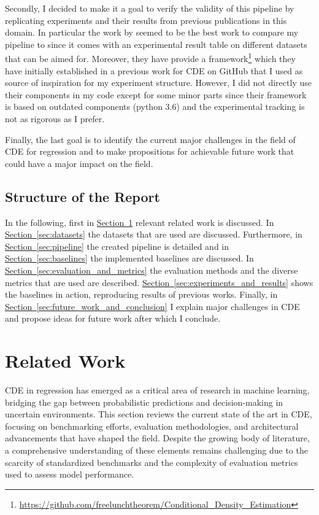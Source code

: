 \documentclass{article}
\newcommand\pef[1]{\hyperref[#1]{Section~\ref{#1}}}
\begin{document}
Secondly, I decided to make it a goal to verify the validity of this pipeline by replicating experiments and their results from previous publications in this domain. In particular the work by \citep{rothfuss2019noise} seemed to be the best work to compare my pipeline to since it comes with an experimental result table on different datasets that can be aimed for. Moreover, they have provide a framework\footnote{\url{https://github.com/freelunchtheorem/Conditional_Density_Estimation}} which they have initially established in a previous work \citep{rothfuss2019conditional} for CDE on GitHub that I used as source of inspiration for my experiment structure. However, I did not directly use their components in my code except for some minor parts since their framework is based on outdated components (python 3.6) and the experimental tracking is not as rigorous as I prefer.

Finally, the last goal is to identify the current major challenges in the field of CDE for regression and to make propositions for achievable future work that could have a major impact on the field.

\subsection{Structure of the Report}
In the following, first in \pef{sec:related_work} relevant related work is discussed. In \pef{sec:datasets} the datasets that are used are discussed. Furthermore, in \pef{sec:pipeline} the created pipeline is detailed and in \pef{sec:baselines} the implemented baselines are discussed. In \pef{sec:evaluation_and_metrics} the evaluation methods and the diverse metrics that are used are described. \pef{sec:experiments_and_results} shows the baselines in action, reproducing results of previous works. Finally, in \pef{sec:future_work_and_conclusion} I explain major challenges in CDE and propose ideas for future work after which I conclude.

\section{Related Work}\label{sec:related_work}
CDE in regression has emerged as a critical area of research in machine learning, bridging the gap between probabilistic predictions and decision-making in uncertain environments. This section reviews the current state of the art in CDE, focusing on benchmarking efforts, evaluation methodologies, and architectural advancements that have shaped the field. Despite the growing body of literature, a comprehensive understanding of these elements remains challenging due to the scarcity of standardized benchmarks and the complexity of evaluation metrics used to assess model performance.
\end{document}

